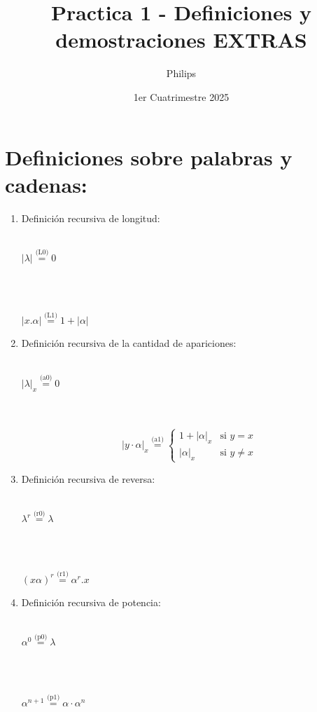 \documentclass[12pt]{article}
\title{Practica 1 - Definiciones y demostraciones EXTRAS}
\author{Philips}
\date{1er Cuatrimestre 2025}
\begin{document}
\maketitle

\section{Definiciones sobre palabras y cadenas:}
\renewcommand\labelenumi{(\theenumi)}
\begin{enumerate}
    \item {Definición recursiva de longitud:}
    \\
    \\
    \centerline{$|\lambda| \overset{\text{(L0)}}{=} 0$}
    \\
    \\
    \centerline{$|x.\alpha| \overset{\text{(L1)}}{=} 1 + |\alpha|$}
    \item {Definición recursiva de la cantidad de apariciones:}
    \\
    \\
    \centerline{$|\lambda|_x \overset{\text{(a0)}}{=} 0$}
    \\
    \\
    \[
    |y \cdot \alpha|_x \overset{\text{(a1)}}{=}
    \begin{cases} 
    1 + |\alpha|_x & \text{si } y = x \\
    |\alpha|_x & \text{si } y \neq x
    \end{cases}
    \]
    \item {Definición recursiva de reversa:}
    \\
    \\
    \centerline{$\lambda^r \overset{\text{(r0)}}{=} \lambda$}
    \\
    \\
    \centerline{$(x\alpha)^r \overset{\text{(r1)}}{=} \alpha^r.x$}
    \item {Definición recursiva de potencia:}
    \\
    \\
    \centerline{$\alpha^0 \overset{\text{(p0)}}{=} \lambda$}
    \\
    \\
    \centerline{$\alpha^{n+1} \overset{\text{(p1)}}{=} \alpha\cdot\alpha^n$}
\end{enumerate}
\end{document}
